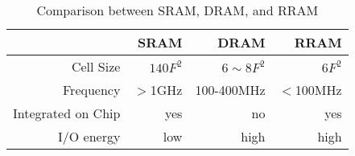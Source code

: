 \begin{table}[htbp]
    \centering
    \caption{Comparison between SRAM, DRAM, and RRAM}
      \begin{tabular}{|r|r|r|r|}
      \hline
            & SRAM  & DRAM  & RRAM \bigstrut\\
      \hline
      Cell Size & $140F^2$ & $6\sim8F^2$ & $6F^2$ \bigstrut\\
      \hline
      Frequency & $>$1GHz & 100-400MHz & $<$100MHz \bigstrut\\
      \hline
      Integrated on Chip & yes   & no    & yes \bigstrut\\
      \hline
      I/O energy & low   & high  & high \bigstrut\\
      \hline
      \end{tabular}
    \label{tab:ram}
\end{table}